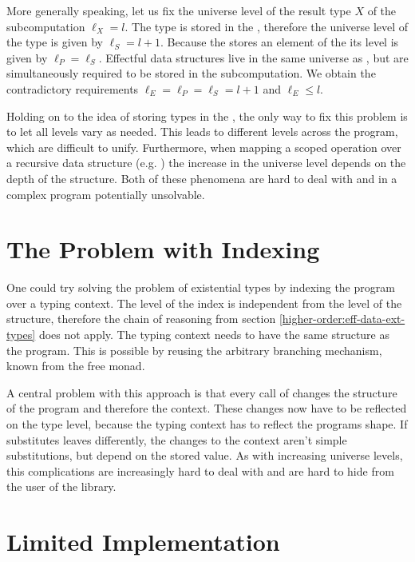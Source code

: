 More generally speaking, let us fix the universe level of the result type $X$ of
the subcomputation $\ell_X = l$.
The type is stored in the , therefore the universe level of the
 type is given by $\ell_S = l + 1$.
Because the  stores an element of the  its
level is given by $\ell_P = \ell_S$.
Effectful data structures live in the same universe as , but
are simultaneously required to be stored in the subcomputation.
We obtain the contradictory requirements $\ell_E = \ell_P = \ell_S = l + 1$ and
$\ell_E  \leqslant l$.

Holding on to the idea of storing types in the , the only way to
fix this problem is to let all levels vary as needed.
This leads to different levels across the program, which are difficult to unify.
Furthermore, when mapping a scoped operation over a recursive data structure
(e.g. ) the increase in the universe level depends on the
depth of the structure.
Both of these phenomena are hard to deal with and in a complex program
potentially unsolvable.


\section{The Problem with Indexing}

One could try solving the problem of existential types by indexing the program
over a typing context.
The level of the index is independent from the level of the structure, therefore
the chain of reasoning from section \ref{higher-order:eff-data-ext-types} does
not apply.
The typing context needs to have the same structure as the program.
This is possible by reusing the arbitrary branching mechanism, known from the
free monad.

A central problem with this approach is that every call of \AgdaFunction{>>=}
changes the structure of the program and therefore the context.
These changes now have to be reflected on the type level, because the typing
context has to reflect the programs shape.
If \AgdaFunction{>>=} substitutes leaves differently, the changes to the context
aren't simple substitutions, but depend on the stored value.
As with increasing universe levels, this complications are increasingly hard to
deal with and are hard to hide from the user of the library.


\section{Limited Implementation}
\label{higher-order:limited-impl}

